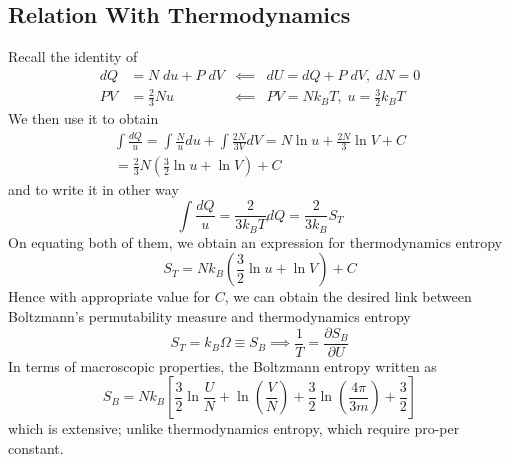 \documentclass[../../../Main.tex]{subfiles}
\begin{document}
\subsection{Relation With Thermodynamics}
Recall the identity of
\begin{align*}
    dQ&=N\;du+P\;dV&\impliedby &dU=dQ+P\;dV,\; dN=0\\
    PV&=\frac{2}{3}Nu&\impliedby &PV=Nk_BT,\;u=\frac{3}{2}k_BT
\end{align*}
We then use it to obtain
\begin{multline*}
    \int \frac{dQ}{u}=\int\frac{N}{u}du+\int \frac{2N}{3V}dV=N\ln u+\frac{2N}{3}\ln V+C\\
    =\frac{2}{3}N\left(\frac{3}{2}\ln u+\ln V\right)+C
\end{multline*}
and to write it in other way
\begin{equation*}
    \int \frac{dQ}{u}=\frac{2}{3k_BT}dQ=\frac{2}{3k_B}S_{T}
\end{equation*}
On equating both of them, we obtain an expression for thermodynamics entropy 
\begin{equation*}
    S_{T}=Nk_B\left(\frac{3}{2}\ln u+\ln V\right)+C
\end{equation*}
Hence with appropriate value for $C$, we can obtain the desired link between Boltzmann's permutability measure and thermodynamics entropy
\begin{equation*}
    S_T=k_B\Omega\equiv S_{B}\implies\frac{1}{T}=\frac{\partial S_B}{\partial U}
\end{equation*}
In terms of macroscopic properties, the Boltzmann entropy written as
\begin{equation*}
    S_B=Nk_B\left[\frac{3}{2}\ln \frac{U}{N}+\ln \left(\frac{V}{N}\right)+\frac{3}{2}\ln\left(\frac{4\pi}{3m}\right)+\frac{3}{2}\right]
\end{equation*}
which is extensive; unlike thermodynamics entropy, which require pro-per constant.
\end{document}
